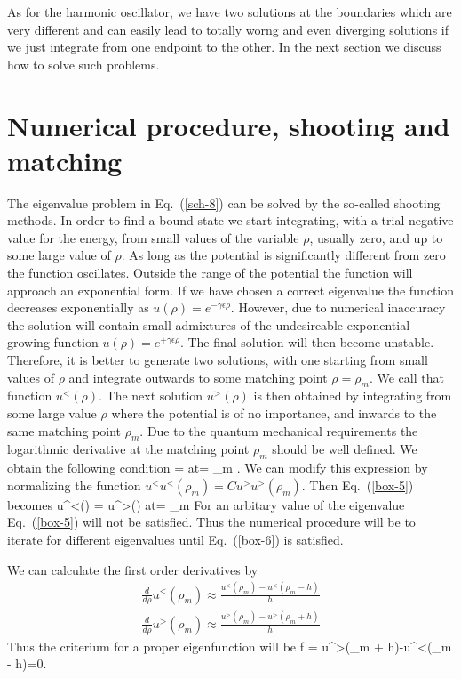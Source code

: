 As for the harmonic oscillator, we have two solutions at the boundaries which are very different
and can easily lead to totally worng and even diverging solutions if we just integrate from 
one endpoint to the other. In the next section we discuss how to solve such problems. 


\section{Numerical procedure, shooting and matching}
%
The eigenvalue problem in Eq.~(\ref{sch-8}) can be solved by the
so-called shooting methods.
In order to find a bound state we start integrating, with a trial negative
value for the energy,  from small values of the variable
$\rho$, usually zero, and up to some large value of $\rho$.
As long as the potential is significantly different from zero the
function oscillates. Outside the range of the potential the function
will approach an exponential form. If we have chosen a correct
eigenvalue the function decreases exponentially as 
$u(\rho) =  e^{-\gamma \epsilon \rho}$. However, due to numerical
inaccuracy the solution will contain small admixtures of the
undesireable exponential growing function 
$u(\rho) =  e^{+\gamma \epsilon \rho}$. The final solution will then
become unstable. Therefore, it is better to generate two solutions, with 
one starting from small values of $\rho$ and integrate outwards to some
matching point $\rho = \rho_m$. We call that function $u^{<}(\rho)$.
The next solution $u^{>}(\rho)$ is then obtained by integrating from some large value
$\rho$ where the potential is of no importance, and inwards to the
same matching point $\rho_m$. 
Due to the quantum mechanical requirements the logarithmic derivative
at the matching point $\rho_m$ should be well defined.
We obtain  the following condition
% 
\be
{}
=   
                 \quad \mbox{at}\quad \rho = \rho_m .
\label{box-5}
\ee
%
We can modify this expression by normalizing the function
 $u^{<}u^{<}(\rho_m) = C u^{>}u^{>}(\rho_m)$.
Then Eq.~(\ref{box-5}) becomes
% 
\be
{} u^{<}(\rho) =  u^{>}(\rho) 
                     \quad \mbox{at}\quad \rho = \rho_m
\label{box-6}
\ee
%
For an arbitary value of the eigenvalue Eq.~(\ref{box-5}) will not be
satisfied. Thus the numerical procedure will be to iterate for different eigenvalues
until Eq.~(\ref{box-6}) is satisfied.

We can calculate the first order derivatives by 
%
\begin{eqnarray}
\frac{d}{d\rho} u^{<}(\rho_m) 
          \approx \frac{u^{<}(\rho_m) - u^{<}(\rho_m - h)}{h}
                                                 \nonumber \\
\frac{d}{d\rho} u^{>}(\rho_m)
           \approx \frac{u^{>}(\rho_m)-u^{>}(\rho_m + h)}{h}
\end{eqnarray}
%
Thus the criterium for a proper eigenfunction will be
% 
\be
f = u^{>}(\rho_m + h)-u^{<}(\rho_m - h)=0.  
\label{eq:matching}
\ee
%



